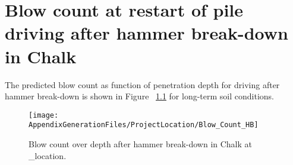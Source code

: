 \chapter{Blow count at restart of pile driving after hammer break-down in Chalk}\label{sec_1}

The predicted blow count as function of penetration depth for driving after
hammer break-down is shown in Figure ~\ref{blow_count_HBreak} for long-term soil conditions.

\begin{figure}[!htbp]
\texttt{[image: AppendixGenerationFiles/ProjectLocation/Blow\_Count\_HB]}
\caption{Blow count over depth after hammer break-down in Chalk at {\ID_location}.}
\label{blow_count_HBreak}\end{figure}

\newpage


